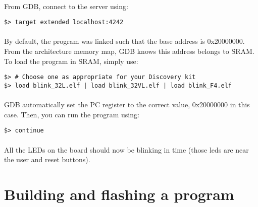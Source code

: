 \documentclass[a4paper, 11pt]{article}
\begin{document}
\paragraph{}
From GDB, connect to the server using:\\
\begin{small}
\begin{lstlisting}[frame=tb]
$> target extended localhost:4242
\end{lstlisting}
\end{small}

\paragraph{}
By default, the program was linked such that the base address is 0x20000000. From the architecture
memory map, GDB knows this address belongs to SRAM. To load the program in SRAM, simply use:\\
\begin{small}
\begin{lstlisting}[frame=tb]
$> # Choose one as appropriate for your Discovery kit
$> load blink_32L.elf | load blink_32VL.elf | load blink_F4.elf
\end{lstlisting}
\end{small}

\paragraph{}
GDB automatically set the PC register to the correct value, 0x20000000 in this case. Then, you
can run the program using:\\
\begin{small}
\begin{lstlisting}[frame=tb]
$> continue
\end{lstlisting}
\end{small}

\paragraph{}
All the LEDs on the board should now be blinking in time (those leds are near the user and reset buttons).

\newpage
\section{Building and flashing a program}
\end{document}
